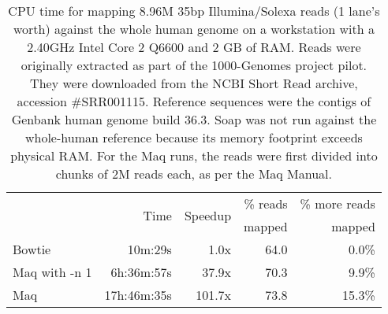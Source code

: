 \documentclass[letterpaper]{article}
\begin{document}
\begin{table}[tp]
\scriptsize
\begin{tabular}{lrrrr}\toprule
 & \multirow{2}{*}{Time} & \multirow{2}{*}{Speedup} & \% reads & \% more reads\\
 &                        &                           & mapped    & mapped        \\[3pt]
\toprule
Bowtie & 10m:29s & 1.0x & 64.0 & 0.0\% \\\midrule
Maq with -n 1 & 6h:36m:57s & 37.9x & 70.3 & 9.9\% \\\midrule
Maq & 17h:46m:35s & 101.7x & 73.8 & 15.3\% \\
\bottomrule
\end{tabular}
\caption{CPU time for mapping 8.96M 35bp Illumina/Solexa reads (1 lane's worth) against the whole human genome on a workstation with a 2.40GHz Intel Core 2 Q6600 and 2 GB of RAM. Reads were originally extracted as part of the 1000-Genomes project pilot. They were downloaded from the NCBI Short Read archive, accession #SRR001115. Reference sequences were the contigs of Genbank human genome build 36.3. Soap was not run against the whole-human reference because its memory footprint exceeds physical RAM. For the Maq runs, the reads were first divided into chunks of 2M reads each, as per the Maq Manual.}
\end{table}
\end{document}
